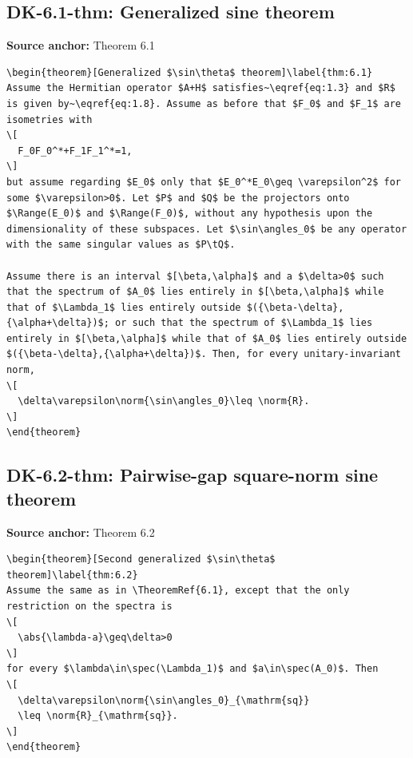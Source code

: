 \subsection*{DK-6.1-thm: Generalized sine theorem}
\noindent\textbf{Source anchor:} Theorem 6.1\\
\begin{verbatim}
\begin{theorem}[Generalized $\sin\theta$ theorem]\label{thm:6.1}
Assume the Hermitian operator $A+H$ satisfies~\eqref{eq:1.3} and $R$ is given by~\eqref{eq:1.8}. Assume as before that $F_0$ and $F_1$ are isometries with
\[
  F_0F_0^*+F_1F_1^*=1,
\]
but assume regarding $E_0$ only that $E_0^*E_0\geq \varepsilon^2$ for some $\varepsilon>0$. Let $P$ and $Q$ be the projectors onto $\Range(E_0)$ and $\Range(F_0)$, without any hypothesis upon the dimensionality of these subspaces. Let $\sin\angles_0$ be any operator with the same singular values as $P\tQ$.

Assume there is an interval $[\beta,\alpha]$ and a $\delta>0$ such that the spectrum of $A_0$ lies entirely in $[\beta,\alpha]$ while that of $\Lambda_1$ lies entirely outside $({\beta-\delta},{\alpha+\delta})$; or such that the spectrum of $\Lambda_1$ lies entirely in $[\beta,\alpha]$ while that of $A_0$ lies entirely outside $({\beta-\delta},{\alpha+\delta})$. Then, for every unitary-invariant norm,
\[
  \delta\varepsilon\norm{\sin\angles_0}\leq \norm{R}.
\]
\end{theorem}
\end{verbatim}

\subsection*{DK-6.2-thm: Pairwise-gap square-norm sine theorem}
\noindent\textbf{Source anchor:} Theorem 6.2\\
\begin{verbatim}
\begin{theorem}[Second generalized $\sin\theta$ theorem]\label{thm:6.2}
Assume the same as in \TheoremRef{6.1}, except that the only restriction on the spectra is
\[
  \abs{\lambda-a}\geq\delta>0
\]
for every $\lambda\in\spec(\Lambda_1)$ and $a\in\spec(A_0)$. Then
\[
  \delta\varepsilon\norm{\sin\angles_0}_{\mathrm{sq}}
  \leq \norm{R}_{\mathrm{sq}}.
\]
\end{theorem}
\end{verbatim}

